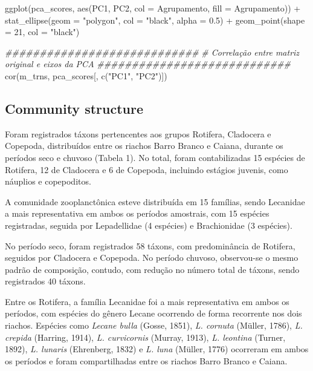 \documentclass[
  letterpaper,
  DIV=11,
  numbers=noendperiod]{scrartcl}
\newenvironment{Shaded}{}{}
\newcommand{\AttributeTok}[1]{\textcolor[rgb]{0.49,0.56,0.16}{#1}}
\newcommand{\CommentTok}[1]{\textcolor[rgb]{0.38,0.63,0.69}{\textit{#1}}}
\newcommand{\DecValTok}[1]{\textcolor[rgb]{0.25,0.63,0.44}{#1}}
\newcommand{\DocumentationTok}[1]{\textcolor[rgb]{0.73,0.13,0.13}{\textit{#1}}}
\newcommand{\FloatTok}[1]{\textcolor[rgb]{0.25,0.63,0.44}{#1}}
\newcommand{\FunctionTok}[1]{\textcolor[rgb]{0.02,0.16,0.49}{#1}}
\newcommand{\NormalTok}[1]{#1}
\newcommand{\SpecialCharTok}[1]{\textcolor[rgb]{0.25,0.44,0.63}{#1}}
\newcommand{\StringTok}[1]{\textcolor[rgb]{0.25,0.44,0.63}{#1}}
\begin{document}
\begin{Shaded}
\begin{Highlighting}[numbers=left,,]
\FunctionTok{ggplot}\NormalTok{(pca\_scores, }\FunctionTok{aes}\NormalTok{(PC1, PC2, }\AttributeTok{col =}\NormalTok{ Agrupamento, }\AttributeTok{fill =}\NormalTok{ Agrupamento)) }\SpecialCharTok{+}
  \FunctionTok{stat\_ellipse}\NormalTok{(}\AttributeTok{geom =} \StringTok{"polygon"}\NormalTok{, }\AttributeTok{col =} \StringTok{"black"}\NormalTok{, }\AttributeTok{alpha =} \FloatTok{0.5}\NormalTok{) }\SpecialCharTok{+}
  \FunctionTok{geom\_point}\NormalTok{(}\AttributeTok{shape =} \DecValTok{21}\NormalTok{, }\AttributeTok{col =} \StringTok{"black"}\NormalTok{)}

\DocumentationTok{\#\#\#\#\#\#\#\#\#\#\#\#\#\#\#\#\#\#\#\#\#\#\#\#\#\#\#\#}
\CommentTok{\# Correlação entre matriz original e eixos da PCA}
\DocumentationTok{\#\#\#\#\#\#\#\#\#\#\#\#\#\#\#\#\#\#\#\#\#\#\#\#\#\#\#\#}
\FunctionTok{cor}\NormalTok{(m\_trns, pca\_scores[, }\FunctionTok{c}\NormalTok{(}\StringTok{"PC1"}\NormalTok{, }\StringTok{"PC2"}\NormalTok{)])}
\end{Highlighting}
\end{Shaded}

\subsection{Community structure}\label{community-structure}

Foram registrados táxons pertencentes aos grupos Rotifera, Cladocera e
Copepoda, distribuídos entre os riachos Barro Branco e Caiana, durante
os períodos seco e chuvoso (Tabela 1). No total, foram contabilizadas 15
espécies de Rotifera, 12 de Cladocera e 6 de Copepoda, incluindo
estágios juvenis, como náuplios e copepoditos.

A comunidade zooplanctônica esteve distribuída em 15 famílias, sendo
Lecanidae a mais representativa em ambos os períodos amostrais, com 15
espécies registradas, seguida por Lepadellidae (4 espécies) e
Brachionidae (3 espécies).

No período seco, foram registrados 58 táxons, com predominância de
Rotifera, seguidos por Cladocera e Copepoda. No período chuvoso,
observou-se o mesmo padrão de composição, contudo, com redução no número
total de táxons, sendo registrados 40 táxons.

Entre os Rotifera, a família Lecanidae foi a mais representativa em
ambos os períodos, com espécies do gênero Lecane ocorrendo de forma
recorrente nos dois riachos. Espécies como \emph{Lecane bulla} (Gosse,
1851), \emph{L. cornuta} (Müller, 1786), \emph{L. crepida} (Harring,
1914), \emph{L. curvicornis} (Murray, 1913), \emph{L. leontina} (Turner,
1892), \emph{L. lunaris} (Ehrenberg, 1832) e \emph{L. luna} (Müller,
1776) ocorreram em ambos os períodos e foram compartilhadas entre os
riachos Barro Branco e Caiana.
\end{document}

